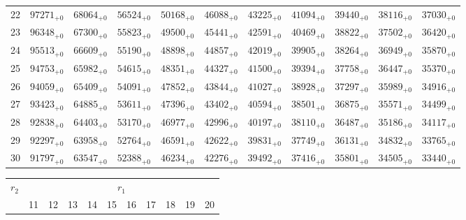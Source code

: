 \documentclass[10pt, a4paper]{article}
\begin{document}
\begin{center}
\begin{tabular}{c || c c c c c | c c c c c}
        22 & \({97271}_{+0}\) & \({68064}_{+0}\) & \({56524}_{+0}\) & \({50168}_{+0}\) & \({46088}_{+0}\) & \({43225}_{+0}\) & \({41094}_{+0}\) & \({39440}_{+0}\) & \({38116}_{+0}\) & \({37030}_{+0}\)\\
        23 & \({96348}_{+0}\) & \({67300}_{+0}\) & \({55823}_{+0}\) & \({49500}_{+0}\) & \({45441}_{+0}\) & \({42591}_{+0}\) & \({40469}_{+0}\) & \({38822}_{+0}\) & \({37502}_{+0}\) & \({36420}_{+0}\)\\
        24 & \({95513}_{+0}\) & \({66609}_{+0}\) & \({55190}_{+0}\) & \({48898}_{+0}\) & \({44857}_{+0}\) & \({42019}_{+0}\) & \({39905}_{+0}\) & \({38264}_{+0}\) & \({36949}_{+0}\) & \({35870}_{+0}\)\\
        25 & \({94753}_{+0}\) & \({65982}_{+0}\) & \({54615}_{+0}\) & \({48351}_{+0}\) & \({44327}_{+0}\) & \({41500}_{+0}\) & \({39394}_{+0}\) & \({37758}_{+0}\) & \({36447}_{+0}\) & \({35370}_{+0}\)\\
        \hline
        26 & \({94059}_{+0}\) & \({65409}_{+0}\) & \({54091}_{+0}\) & \({47852}_{+0}\) & \({43844}_{+0}\) & \({41027}_{+0}\) & \({38928}_{+0}\) & \({37297}_{+0}\) & \({35989}_{+0}\) & \({34916}_{+0}\)\\
        27 & \({93423}_{+0}\) & \({64885}_{+0}\) & \({53611}_{+0}\) & \({47396}_{+0}\) & \({43402}_{+0}\) & \({40594}_{+0}\) & \({38501}_{+0}\) & \({36875}_{+0}\) & \({35571}_{+0}\) & \({34499}_{+0}\)\\
        28 & \({92838}_{+0}\) & \({64403}_{+0}\) & \({53170}_{+0}\) & \({46977}_{+0}\) & \({42996}_{+0}\) & \({40197}_{+0}\) & \({38110}_{+0}\) & \({36487}_{+0}\) & \({35186}_{+0}\) & \({34117}_{+0}\)\\
        29 & \({92297}_{+0}\) & \({63958}_{+0}\) & \({52764}_{+0}\) & \({46591}_{+0}\) & \({42622}_{+0}\) & \({39831}_{+0}\) & \({37749}_{+0}\) & \({36131}_{+0}\) & \({34832}_{+0}\) & \({33765}_{+0}\)\\
        30 & \({91797}_{+0}\) & \({63547}_{+0}\) & \({52388}_{+0}\) & \({46234}_{+0}\) & \({42276}_{+0}\) & \({39492}_{+0}\) & \({37416}_{+0}\) & \({35801}_{+0}\) & \({34505}_{+0}\) & \({33440}_{+0}\)\\
        \hline
    \end{tabular}
    \pagebreak
    \begin{tabular}{c || c c c c c | c c c c c}
        \multirow{2}{*}{\(r_2\)} & \multicolumn{10}{c}{\(r_1\)} \\
        & 11 & 12 & 13 & 14 & 15 & 16 & 17 & 18 & 19 & 20\\
        \hline\hline

\end{tabular}
\end{center}
\end{document}
